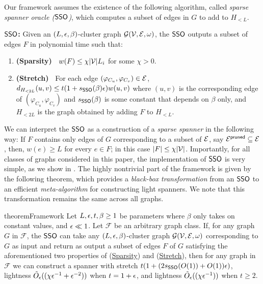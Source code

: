Our framework assumes the existence of the following algorithm, called \emph{sparse spanner oracle ($\mathsf{SSO}$)}, which computes a subset of edges in $G$ to add to $H_{< L}$.


\begin{tcolorbox}
	\hypertarget{SPHigh}{}
	\textbf{$\mathsf{SSO}$:} Given an $(L,\epsilon,\beta)$-cluster graph $\mathcal{G}(\mathcal{V},\mathcal{E},\omega)$, 
	the $\mathsf{SSO}$ outputs a  subset of edges  $F$ in polynomial time such that: 
	\begin{enumerate}[noitemsep]
		\item \textbf{(Sparsity)~} \hypertarget{Sparsity}{} $w(F) \leq \chi|\mathcal{V}| L_i$ for some $\chi> 0$. 
		\item \textbf{(Stretch)~} \hypertarget{Stretch}{} For each edge $(\varphi_{C_u},\varphi_{C_v})\in \mathcal{E}$, $d_{H_{<2L}}(u,v)\leq t(1+s_{\mathsf{SSO}}(\beta)\epsilon)w(u,v)$ 		where $(u,v)$ is the corresponding edge of $(\varphi_{C_u}, \varphi_{C_v})$ and $s_{\mathsf{SSO}}(\beta)$ is some constant that depends on $\beta$  only, and $H_{< 2L}$  is the graph obtained by adding $F$ to $H_{< L}$. 
	\end{enumerate}	
	
\end{tcolorbox}

We can interpret the $\mathsf{SSO}$ as a construction of a {\em sparse spanner} in the following way: If $F$ contains only edges of $G$ corresponding to a subset of $\mathcal{E}$, say $\mathcal{E}^{\mathsf{pruned}} \subseteq \mathcal{E}$, then, $w(e)\geq L$ for every $e \in F$; in this case $|F| \leq \chi|\mathcal{V}|$.  Importantly, for all classes of graphs considered in this paper, the implementation of $\mathsf{SSO}$ is very simple, as we show in .   The highly nontrivial part of the framework is given by the following theorem, which provides a {\em black-box transformation} from an $\mathsf{SSO}$ to an efficient {\em meta-algorithm} for constructing light spanners. We note that this transformation remains the same across all graphs.



\begin{restatable}{theorem}{Framework}
	\label{lm:framework} Let $L,\epsilon, t, \beta \geq 1$ be parameters where $\beta$ only takes on constant values, and $\epsilon \ll 1$. 
	Let $\mathcal{F}$ be an arbitrary graph class.
	If, for any graph $G$ in $\mathcal{F}$, the $\mathsf{SSO}$ can take any $(L,\epsilon,\beta)$-cluster graph $\mathcal{G}(\mathcal{V},\mathcal{E},\omega)$ corresponding to $G$  as input and return as output a subset of edges $F$ of $G$ satisfying the aforementioned two properties of (\hyperlink{Sparsity}{Sparsity}) and (\hyperlink{Stretch}{Stretch}),
	then for any graph in $\mathcal{F}$ we can construct a spanner with stretch $t(1+(2s_{\mathsf{SSO}}(O(1))+O(1))\epsilon)$, lightness $\tilde{O}_{\epsilon}((\chi\epsilon^{-1} + \epsilon^{-2}))$ when $t = 1+\epsilon$, and lightness  $\tilde{O}_{\epsilon}((\chi\epsilon^{-1}))$ when $t\geq 2$. 
\end{restatable}

